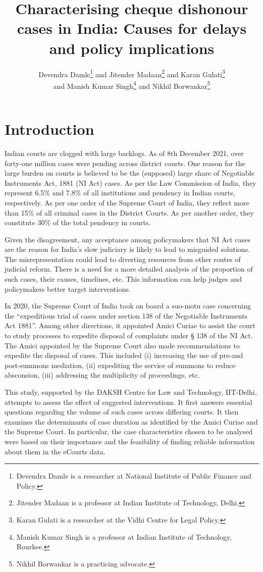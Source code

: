 \documentclass[12pt,a4paper]{article}
\title{Characterising cheque dishonour cases in India: Causes for delays and policy implications}
\author{Devendra Damle\thanks{Devendra Damle is a researcher at National Institute of Public Finance and Policy.} and Jitender Madaan\thanks{Jitender Madaan is a professor at Indian Institute of Technology, Delhi.} and Karan Gulati\thanks{Karan Gulati is a researcher at the Vidhi Centre for Legal Policy.}\\ and Manish Kumar Singh\thanks{Manish Kumar Singh is a professor at Indian Institute of Technology, Rourkee.} and Nikhil Borwankar\thanks{Nikhil Borwankar is a practicing advocate.}}
\begin{document}
\maketitle

\section{Introduction}

Indian courts are clogged with large backlogs. As of 8th December 2021, over forty-one million cases were pending across district courts. One reason for the large burden on courts is believed to be the (supposed) large share of Negotiable Instruments Act, 1881 (NI Act) cases. As per the Law Commission of India, they represent 6.5\% and 7.8\% of all institutions and pendency in Indian courts, respectively. As per one order of the Supreme Court of India, they reflect more than 15\% of all criminal cases in the District Courts. As per another order, they constitute 30\% of the total pendency in courts.

Given the disagreement, any acceptance among policymakers that NI Act cases are the reason for India’s slow judiciary is likely to lead to misguided solutions. The misrepresentation could lead to diverting resources from other routes of judicial reform. There is a need for a more detailed analysis of the proportion of such cases, their causes, timelines, etc. This information can help judges and policymakers better target interventions.

In 2020, the Supreme Court of India took on board a suo-motu case concerning the “expeditious trial of cases under section 138 of the Negotiable Instruments Act 1881”. Among other directions, it appointed Amici Curiae to assist the court to study processes to expedite disposal of complaints under § 138 of the NI Act. The Amici appointed by the Supreme Court also made recommendations to expedite the disposal of cases. This included (i) increasing the use of pre-and post-summons mediation, (ii) expediting the service of summons to reduce absconsion, (iii) addressing the multiplicity of proceedings, etc. 

This study, supported by the DAKSH Centre for Law and Technology, IIT-Delhi, attempts to assess the effect of suggested interventions. It first answers essential questions regarding the volume of such cases across differing courts. It then examines the determinants of case duration as identified by the Amici Curiae and the Supreme Court. In particular, the case characteristics chosen to be analysed were based on their importance and the feasibility of finding reliable information about them in the eCourts data. 
\end{document}
